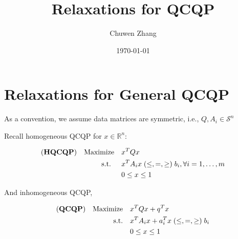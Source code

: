 \documentclass[../main]{subfiles}
\title{Relaxations for QCQP}
\author{Chuwen Zhang}
\date{\today}
\begin{document}
\maketitle
{
  \setcounter{tocdepth}{3}
  \tableofcontents
}

\section{Relaxations for General QCQP}

As a convention, we assume data matrices are symmetric, i.e., \(Q, A_i \in \mathcal{S}^n\)

Recall homogeneous QCQP for \(x \in \mathbb R^n\):

\begin{equation}
  \begin{aligned}
    (\textbf{HQCQP}) \quad \mathrm{Maximize}\quad & x^{T} Q x                                                       \\
    \text { s.t. }  \quad                      & x^{T} A_{i} x\; (\le, =, \ge)  \; b_{i}, \forall i=1, \ldots, m \\
                                               & 0 \le x\le  1
  \end{aligned}
\end{equation}

And inhomogeneous QCQP,

\begin{equation}\label{eq:inhoqcqp}
  \begin{aligned}
    (\textbf{QCQP}) \quad \mathrm{Maximize}\quad & x^TQx +q^T x                                     \\
    \mathrm{s.t.}  \quad                      & x^{T} A_i x  + a_i^Tx   \; (\le, =, \ge)  \; b_i \\
                                              & 0 \le x\le  1
  \end{aligned}
\end{equation}
\end{document}
